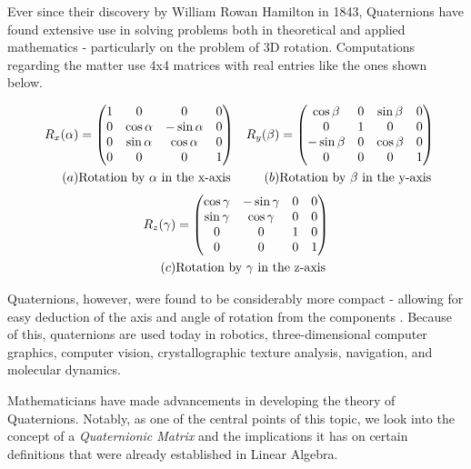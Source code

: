 Ever since their discovery by William Rowan Hamilton in 1843, Quaternions have found extensive use in solving problems both in theoretical and applied mathematics - particularly on the problem of 3D rotation. 
Computations regarding the matter use 4x4 matrices with real entries like the ones shown below.

\begin{figure}[h]
	\begin{align*}
			{R}_{x}{(\alpha)} &=
			\begin{pmatrix}
				1 & 0 & 0 & 0 \\
				0 & \cos{\alpha} & -\sin{\alpha} & 0 \\
				0 & \sin{\alpha} & \cos{\alpha} & 0 \\
				0 & 0 & 0 & 1
			\end{pmatrix}
			&
			{R}_{y}{(\beta)} &=
			\begin{pmatrix}
				\cos{\beta} & 0 & \sin{\beta} & 0 \\
				0 & 1 & 0 & 0 \\
				-\sin{\beta} & 0 & \cos{\beta} & 0 \\
				0 & 0 & 0 & 1
			\end{pmatrix} \\
			(a) & \text{Rotation by $\alpha$ in the x-axis} 
			& 
			(b) & \text{Rotation by $\beta$ in the y-axis}	
	 \end{align*} 
		 \begin{align*}
			{R}_{z}{(\gamma)} &=
			\begin{pmatrix}
				\cos{\gamma} & -\sin{\gamma} & 0 & 0 \\
				\sin{\gamma} & \cos{\gamma} &  0 & 0 \\
				0 & 0 & 1 & 0 \\
				0 & 0 & 0 & 1
		 \end{pmatrix} \\
		 (c) & \text{Rotation by $\gamma$ in the z-axis}	
		\end{align*}
\end{figure}

Quaternions, however, were found to be considerably more compact - allowing for easy deduction of the axis and angle of rotation from the components \cite{lerios}. Because of this, quaternions are used today in robotics, three-dimensional computer graphics, computer vision, crystallographic texture analysis, navigation, and molecular dynamics. 

Mathematicians have made advancements in developing the theory of Quaternions. Notably, as one of the central points of this topic, we look into the concept of a \emph{Quaternionic Matrix} and the implications it has on certain definitions that were already established in Linear Algebra. 


